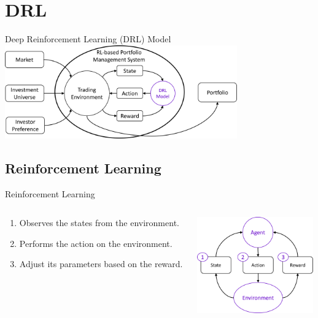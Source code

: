 \section{DRL}   


\begin{frame}{Deep Reinforcement Learning (DRL) Model}
    \tableofcontents[sectionstyle=show/hide, hideothersubsections]
    \centering
    \includegraphics[width=10cm]{images/drl_model.png}
\end{frame}

\subsection{Reinforcement Learning}
\begin{frame}{Reinforcement Learning}
\begin{columns}
    \begin{column}{0.45\textwidth}
    \begin{enumerate}
        \item Observes the states from the environment.
        \item Performs the action on the environment.
        \item Adjust its parameters based on the reward.
    \end{enumerate}
    \end{column}
    \begin{column}{0.45\textwidth}
      \centering
    \includegraphics[width=5cm]{images/rl_overview.png} \end{column}
\end{columns}
\end{frame}


